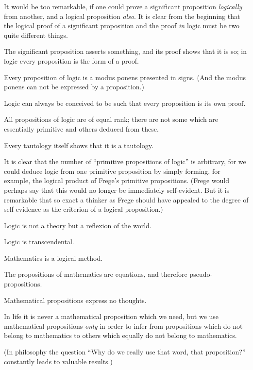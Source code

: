 {It would be too remarkable, if one could prove
a significant proposition \emph{logically} from another, and
a logical proposition \emph{also}. It is clear from the
beginning that the logical proof of a significant
proposition and the proof \emph{in} logic must be two
quite different things.}


{{\stretchyspace
The significant proposition asserts something,
and its proof shows that it is so; in logic every
proposition is the form of a proof.}

Every proposition of logic is a modus ponens
presented in signs. (And the modus ponens can
not be expressed by a proposition.)}


{Logic can always be conceived to be such that
every proposition is its own proof.}


{All propositions of logic are of equal rank;
there are not some which are essentially primitive
and others deduced from these.

Every tautology itself shows that it is a
tautology.}


{It is clear that the number of ``primitive propositions
of logic'' is arbitrary, for we could deduce
logic from one primitive proposition by simply
forming, for example, the logical product of Frege's
primitive propositions. (Frege would perhaps say
that this would no longer be immediately self-evident.
But it is remarkable that so exact a
thinker as Frege should have appealed to the
degree of self-evidence as the criterion of a
logical proposition.)}


{Logic is not a theory but a reflexion of the
world.

Logic is transcendental.}


{Mathematics is a logical method.

The propositions of mathematics are equations,
and therefore pseudo-prop\-o\-si\-tions.}


{Mathematical propositions express no thoughts.}


{In life it is never a mathematical proposition
which we need, but we use mathematical propositions
\emph{only} in order to infer from propositions
which do not belong to mathematics to others
which equally do not belong to mathematics.

(In philosophy the question ``Why do we really
use that word, that proposition?'' constantly leads
to valuable results.)}


